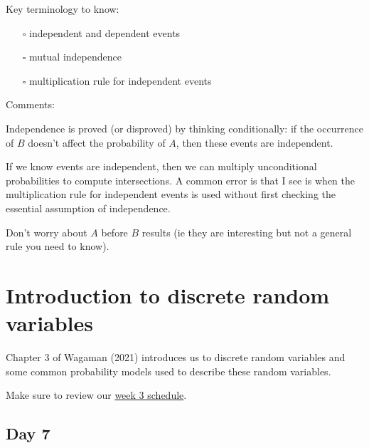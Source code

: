 \documentclass[
  letterpaper,
]{scrbook}
\providecommand{\tightlist}{%
  \setlength{\itemsep}{0pt}\setlength{\parskip}{0pt}}\usepackage{longtable,booktabs,array}
\begin{document}
Key terminology to know:

\begin{itemize}
\tightlist
\item[$\square$]
  independent and dependent events
\item[$\square$]
  mutual independence
\item[$\square$]
  multiplication rule for independent events
\end{itemize}

Comments:

Independence is proved (or disproved) by thinking conditionally: if the
occurrence of \(B\) doesn't affect the probability of \(A\), then these
events are independent.

If we know events are independent, then we can multiply unconditional
probabilities to compute intersections. A common error is that I see is
when the multiplication rule for independent events is used without
first checking the essential assumption of independence.

Don't worry about \(A\) before \(B\) results (ie they are interesting
but not a general rule you need to know).


\chapter{Introduction to discrete random
variables}\label{sec-intro-disc-rv}

Chapter 3 of Wagaman (2021) introduces us to discrete random variables
and some common probability models used to describe these random
variables.

Make sure to review our
\href{https://docs.google.com/spreadsheets/d/1u4l1ho1V35AJJSlt2-UaOW_C8xn46YK5UqrQjajpDH4/edit?usp=sharing}{week
3 schedule}.

\section*{Day 7}\label{day-7}

\end{document}
